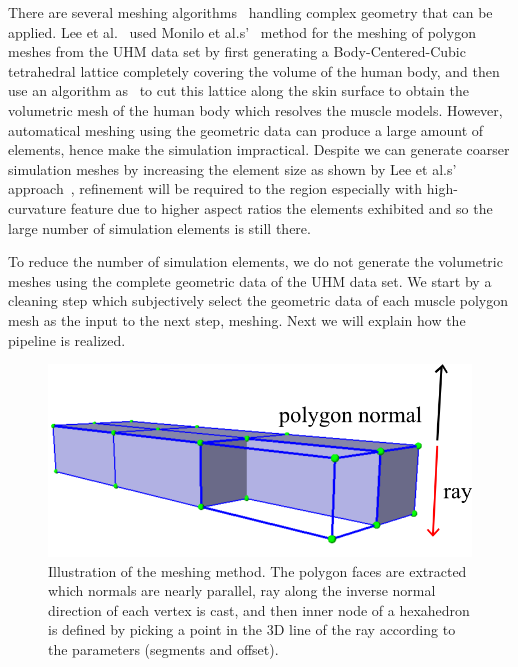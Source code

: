 There are several meshing algorithms~\cite{Labelle:2007:ISF,Molino:2003:acrystalline,Si:2006:quality} handling complex geometry that can be applied. Lee et al.~\cite{Lee:2009:CBM} used Monilo et al.s'~\cite{Molino:2003:acrystalline} method for the meshing of polygon meshes from the UHM data set by first generating a Body-Centered-Cubic tetrahedral lattice completely covering the volume of the human body, and then use an algorithm as~\cite{Sifakis:2007:ACD} to cut this lattice along the skin surface to obtain the volumetric mesh of the human body which resolves the muscle models. However, automatical meshing using the geometric data can produce a large amount of elements, hence make the simulation impractical. Despite we can generate coarser simulation meshes by increasing the element size as shown by Lee et al.s' approach~\cite{Lee:2009:CBM}, refinement will be required to the region especially with high-curvature feature due to higher aspect ratios the elements exhibited and so the large number of simulation elements is still there.

To reduce the number of simulation elements, we do not generate the volumetric meshes using the complete geometric data of the UHM data set. We start by a cleaning step which subjectively select
the geometric data of each muscle polygon mesh as the input to the next step, meshing. Next we will explain how the pipeline is realized.
\begin{figure}
\centering
\includegraphics[width=\textwidth]{vriphys/meshing}
\caption{Illustration of the meshing method. The polygon faces are extracted which normals are nearly parallel, ray along the inverse normal direction of each vertex is cast, and then inner node of a hexahedron is defined by picking a point in the 3D line of the ray
according to the parameters (segments and offset).}
\label{fig:meshing}
\end{figure}

